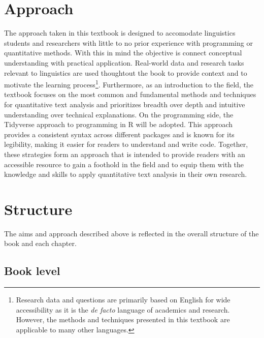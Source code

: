 \documentclass[
  letterpaper,
  DIV=11,
  numbers=noendperiod]{scrreport}
\theoremstyle{definition}
\theoremstyle{remark}
\begin{document}
\hypertarget{sec-p-approach}{%
\section*{Approach}\label{sec-p-approach}}


The approach taken in this textbook is designed to accomodate
linguistics students and researchers with little to no prior experience
with programming or quantitative methods. With this in mind the
objective is connect conceptual understanding with practical
application. Real-world data and research tasks relevant to linguistics
are used thoughtout the book to provide context and to motivate the
learning process\footnote{Research data and questions are primarily
  based on English for wide accessibility as it is the \emph{de facto}
  language of academics and research. However, the methods and
  techniques presented in this textbook are applicable to many other
  languages.}. Furthermore, as an introduction to the field, the
textbook focuses on the most common and fundamental methods and
techniques for quantitative text analysis and prioritizes breadth over
depth and intuitive understanding over technical explanations. On the
programming side, the Tidyverse approach to programming in R will be
adopted. This approach provides a consistent syntax across different
packages and is known for its legibility, making it easier for readers
to understand and write code. Together, these strategies form an
approach that is intended to provide readers with an accessible resource
to gain a foothold in the field and to equip them with the knowledge and
skills to apply quantitative text analysis in their own research.

\hypertarget{sec-p-structure}{%
\section*{Structure}\label{sec-p-structure}}


The aims and approach described above is reflected in the overall
structure of the book and each chapter.

\hypertarget{sec-p-structure-book}{%
\subsection*{Book level}\label{sec-p-structure-book}}
\end{document}
